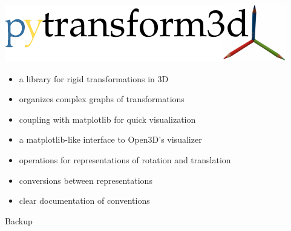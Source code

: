 \documentclass[14pt,aspectratio=169]{beamer}
\begin{document}
\begin{frame}
\includegraphics[width=\textwidth]{images/logo}

\begin{itemize}
\item a library for rigid transformations in 3D
\item organizes complex graphs of transformations
\item coupling with matplotlib for quick visualization
\item a matplotlib-like interface to Open3D’s visualizer
\item operations for representations of rotation and translation
\item conversions between representations
\item clear documentation of conventions
\end{itemize}
\end{frame}

\begin{frame}
\begin{center}
\Large
Backup
\end{center}
\end{frame}

\end{document}
